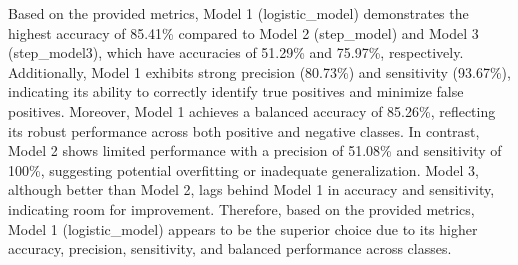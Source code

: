 \documentclass[
]{article}
\begin{document}
Based on the provided metrics, Model 1 (logistic\_model) demonstrates
the highest accuracy of 85.41\% compared to Model 2 (step\_model) and
Model 3 (step\_model3), which have accuracies of 51.29\% and 75.97\%,
respectively. Additionally, Model 1 exhibits strong precision (80.73\%)
and sensitivity (93.67\%), indicating its ability to correctly identify
true positives and minimize false positives. Moreover, Model 1 achieves
a balanced accuracy of 85.26\%, reflecting its robust performance across
both positive and negative classes. In contrast, Model 2 shows limited
performance with a precision of 51.08\% and sensitivity of 100\%,
suggesting potential overfitting or inadequate generalization. Model 3,
although better than Model 2, lags behind Model 1 in accuracy and
sensitivity, indicating room for improvement. Therefore, based on the
provided metrics, Model 1 (logistic\_model) appears to be the superior
choice due to its higher accuracy, precision, sensitivity, and balanced
performance across classes.
\end{document}
